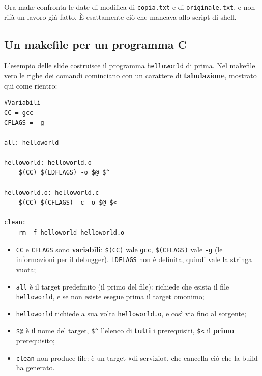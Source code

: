 Ora make confronta le date di modifica di \texttt{copia.txt} e di \texttt{originale.txt}, e non rifà un lavoro già
fatto. È esattamente ciò che mancava allo script di shell.

\subsection{Un makefile per un programma C}

L'esempio delle slide costruisce il programma \texttt{helloworld} di prima. Nel makefile vero le righe dei comandi
cominciano con un carattere di \textbf{tabulazione}, mostrato qui come rientro:

\begin{lstlisting}[style=make, name=makefile]
#Variabili
CC = gcc
CFLAGS = -g

all: helloworld

helloworld: helloworld.o
	$(CC) $(LDFLAGS) -o $@ $^

helloworld.o: helloworld.c
	$(CC) $(CFLAGS) -c -o $@ $<

clean:
	rm -f helloworld helloworld.o
\end{lstlisting}

\begin{itemize}
  \item \texttt{CC} e \texttt{CFLAGS} sono \textbf{variabili}: \texttt{\$(CC)} vale \texttt{gcc}, \texttt{\$(CFLAGS)}
        vale \texttt{-g} (le informazioni per il debugger). \texttt{LDFLAGS} non è definita, quindi vale la stringa vuota;
  \item \texttt{all} è il target predefinito (il primo del file): richiede che esista il file \texttt{helloworld}, e se
        non esiste esegue prima il target omonimo;
  \item \texttt{helloworld} richiede a sua volta \texttt{helloworld.o}, e così via fino al sorgente;
  \item \texttt{\$@} è il nome del target, \texttt{\$\textasciicircum} l'elenco di \textbf{tutti} i prerequisiti,
        \texttt{\$<} il \textbf{primo} prerequisito;
  \item \texttt{clean} non produce file: è un target «di servizio», che cancella ciò che la build ha generato.
\end{itemize}


